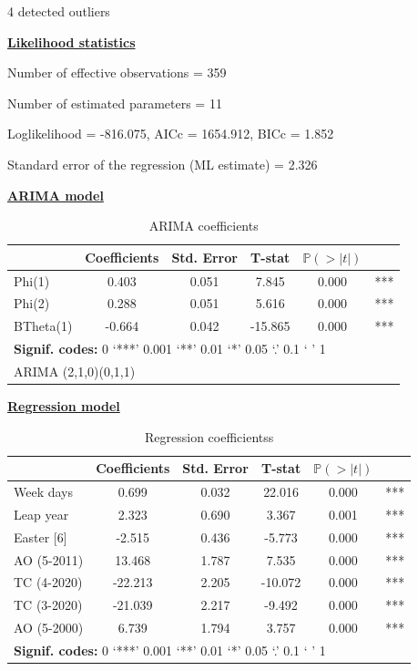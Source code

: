 \documentclass[
]{article}
\begin{document}
4 detected outliers

\underline{\textbf{Likelihood statistics}}

Number of effective observations = 359

Number of estimated parameters = 11

Loglikelihood = -816.075, AICc = 1654.912, BICc = 1.852

Standard error of the regression (ML estimate) = 2.326

\underline{\textbf{ARIMA model}}

\begin{table}[H]
\centering
\caption{\label{tab:unnamed-chunk-4}ARIMA coefficients}
\centering
\begin{tabular}[t]{lccccc}
\toprule
  & Coefficients & Std. Error & T-stat & $\mathbb P (> \lvert t \rvert)$ & \\
\midrule
Phi(1) & 0.403 & 0.051 & 7.845 & 0.000 & ***\\
Phi(2) & 0.288 & 0.051 & 5.616 & 0.000 & ***\\
BTheta(1) & -0.664 & 0.042 & -15.865 & 0.000 & ***\\
\bottomrule
\multicolumn{6}{l}{\rule{0pt}{1em}\textbf{Signif. codes: }0 `***' 0.001 `**' 0.01 `*' 0.05 `.' 0.1 ` ' 1}\\
\multicolumn{6}{l}{\rule{0pt}{1em}ARIMA (2,1,0)(0,1,1)}\\
\end{tabular}
\end{table}

\underline{\textbf{Regression model}}

\begin{table}[H]
\centering
\caption{\label{tab:unnamed-chunk-4}Regression coefficientss}
\centering
\begin{tabular}[t]{lccccc}
\toprule
  & Coefficients & Std. Error & T-stat & $\mathbb P (> \lvert t \rvert)$ & \\
\midrule
Week days & 0.699 & 0.032 & 22.016 & 0.000 & ***\\
Leap year & 2.323 & 0.690 & 3.367 & 0.001 & ***\\
Easter [6] & -2.515 & 0.436 & -5.773 & 0.000 & ***\\
AO (5-2011) & 13.468 & 1.787 & 7.535 & 0.000 & ***\\
TC (4-2020) & -22.213 & 2.205 & -10.072 & 0.000 & ***\\
\addlinespace
TC (3-2020) & -21.039 & 2.217 & -9.492 & 0.000 & ***\\
AO (5-2000) & 6.739 & 1.794 & 3.757 & 0.000 & ***\\
\bottomrule
\multicolumn{6}{l}{\rule{0pt}{1em}\textbf{Signif. codes: }0 `***' 0.001 `**' 0.01 `*' 0.05 `.' 0.1 ` ' 1}\\
\end{tabular}
\end{table}
\end{document}
